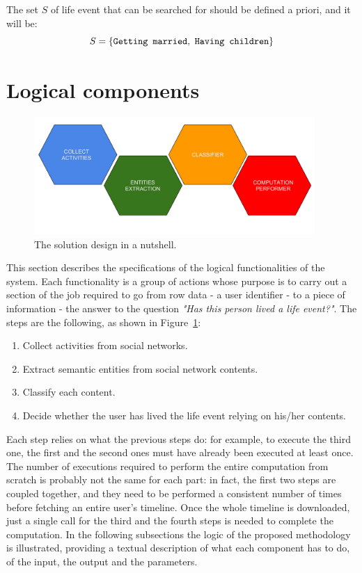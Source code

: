 The set $S$ of life event that can be searched for should be defined a priori, and it will be: 
\[
S = \{\text{\texttt{Getting married}}, \text{ \texttt{Having children}}\}
\]

\section{Logical components}
\label{sec:logicdescr}

\begin{figure}
\centering
\includegraphics[width=%
0.95\textwidth]{img/Solutiondesign_nutshell}
\caption{The solution design in a nutshell.}
\label{fig:nutshell}
\end{figure}

This section describes the specifications of the logical functionalities of the system. Each functionality is a group of actions whose purpose is to carry out a section of the job required to go from row data - a user identifier - to a piece of information - the answer to the question \textit{"Has this person lived a life event?"}. The steps are the following, as shown in Figure~\ref{fig:nutshell}:
\begin{enumerate}
\item Collect activities from social networks.
\item Extract semantic entities from social network contents.
\item Classify each content.
\item Decide whether the user has lived the life event relying on his/her contents.
\end{enumerate}
Each step relies on what the previous steps do: for example, to execute the third one, the first and the second ones must have already been executed at least once. The number of executions required to perform the entire computation from scratch is probably not the same for each part: in fact, the first two steps are coupled together, and they need to be performed a consistent number of times before fetching an entire user's timeline. Once the whole timeline is downloaded, just a single call for the third and the fourth steps is needed to complete the computation. In the following subsections the logic of the proposed methodology is illustrated, providing a textual description of what each component has to do, of the input, the output and the parameters. 

